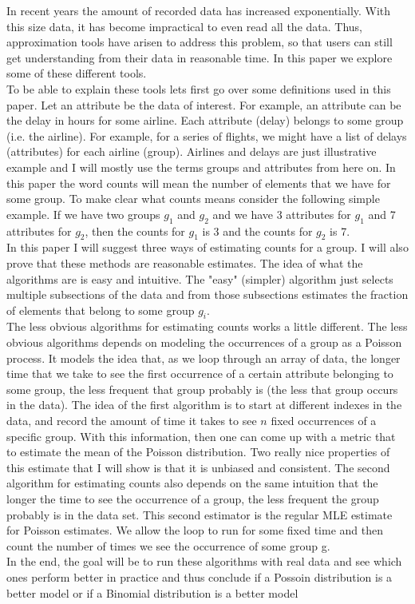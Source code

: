 \documentclass[a4paper]{article}
\begin{document}
In recent years the amount of recorded data has increased exponentially.
With this size data, it has become impractical to even read all the data.
Thus, approximation tools have arisen to address this problem, so that users can still get understanding from their data in reasonable time.
In this paper we explore some of these different tools.\\
\indent To be able to explain these tools lets first go over some definitions used in this paper.
Let an attribute be the data of interest.
For example, an attribute can be the delay in hours for some airline.
Each attribute (delay) belongs to some group (i.e. the airline).
For example, for a series of flights, we might have a list of delays (attributes) for each airline (group).
Airlines and delays are just illustrative example and
I will mostly use the terms groups and attributes from here on.
In this paper the word counts will mean the number of elements that we have for some group.
To make clear what counts means consider the following simple example.
If we have two groups $g_1$ and $g_2$ and we have 3 attributes for $g_1$ and 7 attributes for $g_2$, then the counts for $g_1$ is 3 and the counts for $g_2$ is 7.\\
\indent In this paper I will suggest three ways of estimating counts for a group.
I will also prove that these methods are reasonable estimates.
The idea of what the algorithms are is easy and intuitive.
The "easy" (simpler) algorithm just selects multiple subsections of the data and from those subsections estimates the fraction of elements that belong to some group $g_i$. \\
\indent The less obvious algorithms for estimating counts works a little different.
The less obvious algorithms depends on modeling the occurrences of a group as a Poisson process.
It models the idea that, as we loop through an array of data, the longer time that we take to see the first occurrence of a certain attribute belonging to some group, the less frequent that group probably is (the less that group occurs in the data).
The idea of the first algorithm is to start at different indexes in the data, and record the amount of time it takes to see $n$ fixed occurrences of a specific group.
With this information, then one can come up with a metric that to estimate the mean of the Poisson distribution.
Two really nice properties of this estimate that I will show is that it is unbiased and consistent.
\indent The second algorithm for estimating counts also depends on the same intuition that the longer the time to see the occurrence of a group, the less frequent the group probably is in the data set.
This second estimator is the regular MLE estimate for Poisson estimates.
We allow the loop to run for some fixed time and then count the number of times we see the occurrence of some group g. \\
\indent In the end, the goal will be to run these algorithms with real data and see which ones perform better in practice and thus conclude if a Possoin distribution is a better model or if a Binomial distribution is a better model
\end{document}
